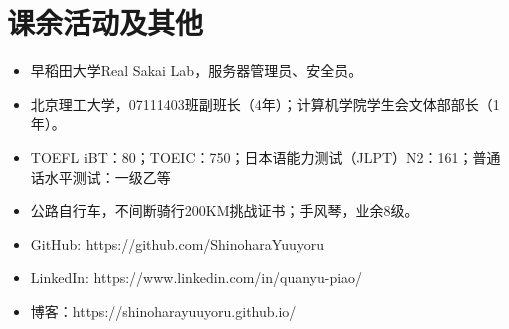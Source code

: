 \documentclass{resume}
\begin{document}
\section{课余活动及其他}
\begin{itemize}
  \item 早稻田大学Real Sakai Lab，服务器管理员、安全员。
  \item 北京理工大学，07111403班副班长（4年）；计算机学院学生会文体部部长（1年）。
  \item TOEFL iBT：80；TOEIC：750；日本语能力测试（JLPT）N2：161；普通话水平测试：一级乙等
  \item 公路自行车，不间断骑行200KM挑战证书；手风琴，业余8级。
  \item GitHub: https://github.com/ShinoharaYuuyoru
  \item LinkedIn: https://www.linkedin.com/in/quanyu-piao/
  \item 博客：https://shinoharayuuyoru.github.io/
\end{itemize}

%
%
\end{document}
